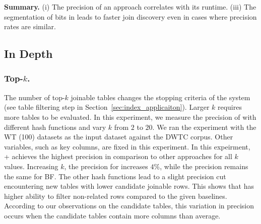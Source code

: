 
\noindent\textbf{Summary.}
(i) The precision of an approach correlates with its runtime.
(iii) The segmentation of bits in \hash leads to faster join discovery even in cases where precision rates are similar.

\subsection{\system In Depth}
\subsubsection{Top-$k$.}
% 
The number of top-$k$ joinable tables changes the stopping criteria of the system (see table filtering step in Section~\ref{sec:index_applicaiton}).
Larger $k$ requires more tables to be evaluated.
In this experiment, we measure the precision of \system with different hash functions and vary $k$ from $2$ to $20$.
We ran the experiment with the WT (100) datasets as the input dataset against the DWTC corpus.
Other variables, such as key columns, are fixed in this experiment.
In this expeirment, \system + \hash achieves the highest precision in comparison to other approaches for all $k$ values.
Increasing $k$, the precision for \hash increases $4\%$, while the precision remains the same for BF. The other hash functions lead to a slight precision cut encountering new tables with lower candidate joinable rows. This shows that \hash has higher ability to filter non-related rows compared to the given baselines. According to our observations on the candidate tables, this variation in precision occurs when the candidate tables contain more columns than average.

